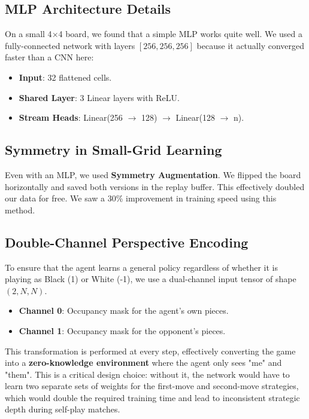 \documentclass[9pt,a4paper,twocolumn,twoside]{rho-class/rho}
\begin{document}
    \subsection{MLP Architecture Details}
        On a small 4$\times$4 board, we found that a simple MLP works quite well. We used a fully-connected network with layers $[256, 256, 256]$ because it actually converged faster than a CNN here:
        \begin{itemize}
            \item \textbf{Input}: 32 flattened cells.
            \item \textbf{Shared Layer}: 3 Linear layers with ReLU.
            \item \textbf{Stream Heads}: Linear(256 $\rightarrow$ 128) $\rightarrow$ Linear(128 $\rightarrow$ n).
        \end{itemize}

    \subsection{Symmetry in Small-Grid Learning}
        Even with an MLP, we used \textbf{Symmetry Augmentation}. We flipped the board horizontally and saved both versions in the replay buffer. This effectively doubled our data for free. We saw a 30\% improvement in training speed using this method.

    \subsection{Double-Channel Perspective Encoding}
        To ensure that the agent learns a general policy regardless of whether it is playing as Black (1) or White (-1), we use a dual-channel input tensor of shape $(2, N, N)$. 
        \begin{itemize}
            \item \textbf{Channel 0}: Occupancy mask for the agent's own pieces.
            \item \textbf{Channel 1}: Occupancy mask for the opponent's pieces.
        \end{itemize}
        This transformation is performed at every step, effectively converting the game into a \textbf{zero-knowledge environment} where the agent only sees "me" and "them". This is a critical design choice: without it, the network would have to learn two separate sets of weights for the first-move and second-move strategies, which would double the required training time and lead to inconsistent strategic depth during self-play matches.
\end{document}
